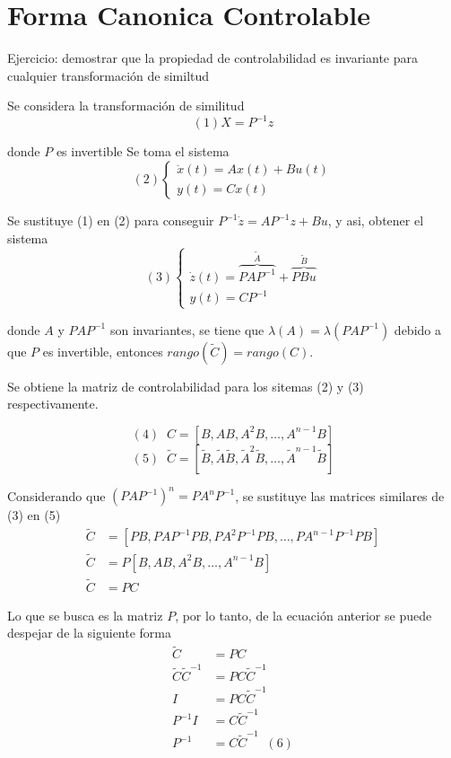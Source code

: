 \section{Forma Canonica Controlable}
Ejercicio: demostrar que la propiedad de controlabilidad es invariante para cualquier transformación de similtud

Se considera la transformación de similitud
\[
    (1) X=P^{-1}z
\]

donde \( P \) es invertible
Se toma el sistema 
\[
    (2)
    \left\{
        \begin{array}{lll}
            \dot{x}(t) = Ax(t) + Bu(t)\\
            y(t) = Cx(t)
        \end{array}
    \right.
\]

Se sustituye (1) en (2) para conseguir \( P^{-1}\dot{z} = AP^{-1}z+Bu \), y asi, obtener el sistema
\[
    (3)
    \left\{
        \begin{array}{lll}
            \dot{z}(t) =
                \overbrace{PAP^{-1}}^{\tilde{A}}+ 
                \overbrace{PBu}^{\tilde{B}}\\
            y(t) = CP^{-1}
        \end{array}
    \right.
\]

donde \( A \) y \( PAP^{-1} \) son invariantes, se tiene que \( \lambda (A) = \lambda(PAP^{-1}) \) debido a que \( P \) es invertible, entonces \(rango(\tilde{C}) = rango(C)\).

Se obtiene la matriz de controlabilidad para los sitemas (2) y (3) respectivamente.

\[
    (4)\;\;
    C=[B , AB , A^{2}B , \ldots , A^{n-1}B]
\]
\[
    (5)\;\;
    \tilde{C}=[\tilde{B} , \tilde{A}\tilde{B} , \tilde{A}^{2}\tilde{B} , \ldots , \tilde{A}^{n-1}\tilde{B}]
\]

Considerando que \( (PAP^{-1})^{n} = PA^{n}P^{-1} \), se sustituye las matrices similares de (3) en (5)
\[
    \begin{split}
        \tilde{C} & = [PB, PAP^{-1}PB, PA^{2}P^{-1}PB, \ldots, PA^{n-1}P^{-1}PB] \\
        \tilde{C} & = P[B, AB, A^{2}B, \ldots, A^{n-1}B] \\
        \tilde{C} & = PC 
    \end{split}
\]

Lo que se busca es la matriz \( P \), por lo tanto, de la ecuación anterior se puede despejar de la siguiente forma
\[
    \begin{split}
        \tilde{C} & = PC \\
        \tilde{C}\tilde{C}^{-1} & = PC\tilde{C}^{-1} \\
        I & = PC\tilde{C}^{-1} \\
        P^{-1}I & = C\tilde{C}^{-1} \\
        P^{-1} & = C\tilde{C}^{-1}\;\;(6)
    \end{split}
\]

